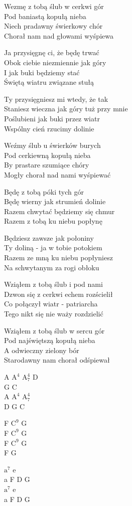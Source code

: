 \begin{text}
Wezmę z tobą ślub w cerkwi gór\\
Pod baniastą kopułą nieba\\
Niech pradawny świerkowy chór\\
Chorał nam nad głowami wyśpiewa

Ja przysięgnę ci, że będę trwać\\
Obok ciebie niezmiennie jak góry\\
I jak buki będziemy stać\\
Świętą wiatru związane stułą

Ty przysięgniesz mi wtedy, że tak\\
Staniesz wieczna jak góry tuż przy mnie\\
Poślubieni jak buki przez wiatr\\
Wspólny cień rzucimy dolinie

Weźmy ślub u świerków burych\\
Pod cerkiewną kopułą nieba\\
By prastare szumiące chóry\\
Mogły chorał nad nami wyśpiewać

Będę z tobą póki tych gór\\
Będę wierny jak strumień dolinie\\
Razem chwytać będziemy się chmur\\
Razem z tobą ku niebu popłynę

Będziesz zawsze jak połoniny\\
Ty doliną - ja w tobie potokiem\\
Razem ze mną ku niebu popłyniesz\\
Na schwytanym za rogi obłoku

Wziąłem z tobą ślub i pod nami\\
Dzwon się z cerkwi echem rozścielił\\
Co połączył wiatr - patriarcha\\
Tego nikt się nie waży rozdzielić

Wziąłem z tobą ślub w sercu gór\\
Pod najświętszą kopułą nieba\\
A odwieczny zielony bór\\
Starodawny nam chorał odśpiewał
\end{text}
\begin{chord}
    A $\mathrm{A^4}$ $\mathrm{A_7^4}$ D\\
    G C\\
    A $\mathrm{A^4}$ $\mathrm{A_7^4}$\\
    D G C

    F $\mathrm{C^9}$ G\\
    F $\mathrm{C^9}$ G\\
    F $\mathrm{C^9}$ G\\
    F G

    $\mathrm{a^7}$ e\\
    a F D G\\
    $\mathrm{a^7}$ e\\
    a F D G
\end{chord}
